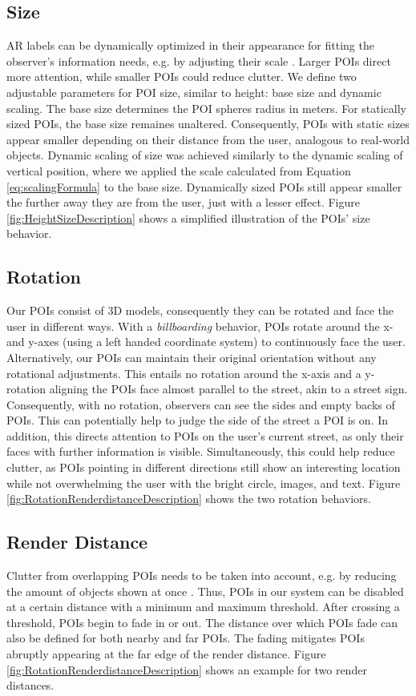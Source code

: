 \subsection{Size}
\label{sec:system_size}
AR labels can be dynamically optimized in their appearance for fitting the observer's information needs, e.g. by adjusting their scale \cite{Lee24SituatedVisAR}. Larger POIs direct more attention, while smaller POIs could reduce clutter. We define two adjustable parameters for POI size, similar to height: base size and dynamic scaling. The base size determines the POI spheres radius in meters. For statically sized POIs, the base size remaines unaltered. Consequently, POIs with static sizes appear smaller depending on their distance from the user, analogous to real-world objects. Dynamic scaling of size was achieved similarly to the dynamic scaling of vertical position, where we applied the scale calculated from Equation \ref{eq:scalingFormula} to the base size. Dynamically sized POIs still appear smaller the further away they are from the user, just with a lesser effect. Figure \ref{fig:HeightSizeDescription} shows a simplified illustration of the POIs' size behavior.

\subsection{Rotation}
\label{sec:system_rotation}
Our POIs consist of 3D models, consequently they can be rotated and face the user in different ways. With a \textit{billboarding} behavior, POIs rotate around the x- and y-axes (using a left handed coordinate system) to continuously face the user. Alternatively, our POIs can maintain their original orientation without any rotational adjustments. This entails no rotation around the x-axis and a y-rotation aligning the POIs face almost parallel to the street, akin to a street sign. Consequently, with no rotation, observers can see the sides and empty backs of POIs. This can potentially help to judge the side of the street a POI is on. In addition, this directs attention to POIs on the user's current street, as only their faces with further information is visible. Simultaneously, this could help reduce clutter, as POIs pointing in different directions still show an interesting location while not overwhelming the user with the bright circle, images, and text. Figure \ref{fig:RotationRenderdistanceDescription} shows the two rotation behaviors.


\subsection{Render Distance}
\label{sec:system_renderdistance}
Clutter from overlapping POIs needs to be taken into account, e.g. by reducing the amount of objects shown at once \cite{Lee24SituatedVisAR}. Thus, POIs in our system can be disabled at a certain distance with a minimum and maximum threshold. After crossing a threshold, POIs begin to fade in or out. The distance over which POIs fade can also be defined for both nearby and far POIs. The fading mitigates POIs abruptly appearing at the far edge of the render distance. Figure \ref{fig:RotationRenderdistanceDescription} shows an example for two render distances.


